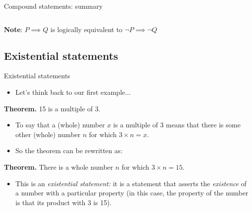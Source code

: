 \documentclass[11pt,aspectratio=1610]{beamer}
\begin{document}
\begin{frame}{Compound statements: summary}
\begin{columns}[t]
		\end{columns}
		\vspace{2mm}
		
\textbf{Note}: $P\implies Q$ is logically equivalent to $\neg P \implies \neg Q $		
		
		
	\end{frame}
	
\subsection{Existential statements}		
		\begin{frame}{Existential statements}
			\begin{itemize}
				\item Let's think back to our first example... 
			\end{itemize}
			\vspace{2mm}
			
			\textbf{Theorem.} 15 is a multiple of 3. \p
			\begin{itemize}
				\item To say that a (whole) number $x$ is a multiple of 3 means that there is some other (whole) number $n$ for which $3\times n = x$. \p
				\item So the theorem can be rewritten as: 
			\end{itemize}
			\vspace{2mm}
			
			
			\textbf{Theorem.} There is a whole number $n$ for which $3 \times n = 15$. \p
			\begin{itemize}
				\item This is an \emph{existential statement:} it is a statement that asserts the \textit{existence} of a number with a particular property (in this case, the property of the number is that its product with 3 is 15). 
			\end{itemize}
		\end{frame}
\end{document}
